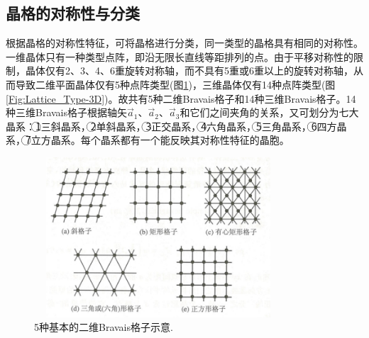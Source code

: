 \subsection{晶格的对称性与分类}
根据晶格的对称性特征，可将晶格进行分类，同一类型的晶格具有相同的对称性。一维晶体只有一种类型点阵，即沿无限长直线等距排列的点。由于平移对称性的限制，晶体仅有2、3、4、6重旋转对称轴，而不具有5重或6重以上的旋转对称轴，从而导致二维平面晶体仅有5种点阵类型(图\ref{Fig:Lattice_Type-2D})，三维晶体仅有14种点阵类型(图\ref{Fig:Lattice_Type-3D})。故共有5种二维Bravais格子和14种三维Bravais格子。14种三维Bravais格子根据轴矢$\vec a_1$、$\vec a_2$、$\vec a_3$和它们之间夹角的关系，又可划分为七大晶系：\textcircled{1}三斜晶系，\textcircled{2}单斜晶系，\textcircled{3}正交晶系，\textcircled{4}六角晶系，\textcircled{5}三角晶系，\textcircled{6}四方晶系，\textcircled{7}立方晶系。每个晶系都有一个能反映其对称性特征的晶胞。
\begin{figure}[h!]
\centering
\vspace*{-0.05in}
\includegraphics[height=2.35in,width=3.65in,viewport=0 0 90 60,clip]{Figures/Bravais_Lattice-2D.jpg}
\caption{\small \textrm{5种基本的二维Bravais格子示意.}}%
\label{Fig:Lattice_Type-2D}
\end{figure}

